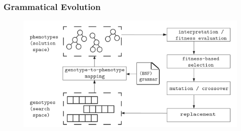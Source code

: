 \documentclass[aspectratio=169]{beamer}
\begin{document}
		\begin{frame}
			\frametitle{Grammatical Evolution}

			\begin{figure}
				\includegraphics[width=\linewidth]{images/ge_example.png}
			\end{figure}

		\end{frame}
\end{document}
